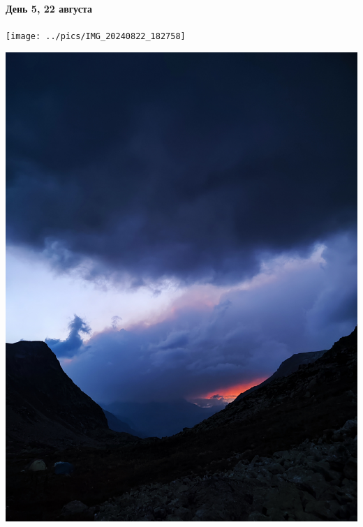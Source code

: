 \begin{frame}
	\frametitle{\textAlpha\textpi \textomikron\textkappa\textalpha\textlambda\textnu\textpsi\textiota\textvarsigma}
	\framesubtitle{День 5, 22 августа}
		{\tiny
		\begin{minipage}{\fourpicsize}
			\centering
			\texttt{[image: ../pics/IMG\_20240822\_182758]}			
		\end{minipage}
		\hfill
		\begin{minipage}{\fourpicsize}
			\centering
			\includegraphics[width=\textwidth]{../pics/IMG_20240822_193315}			
		\end{minipage}
		\vfill
		}			
\end{frame} 


